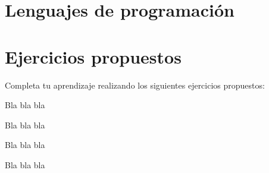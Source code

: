 \section{Lenguajes de programación}

\section{Ejercicios propuestos}

Completa tu aprendizaje realizando los siguientes ejercicios propuestos:

\begin{exercise}
Bla bla bla
\end{exercise}

\begin{exercise}
Bla bla bla
\end{exercise}

\begin{exercise}
Bla bla bla
\end{exercise}

\begin{exercise}
Bla bla bla
\end{exercise}
